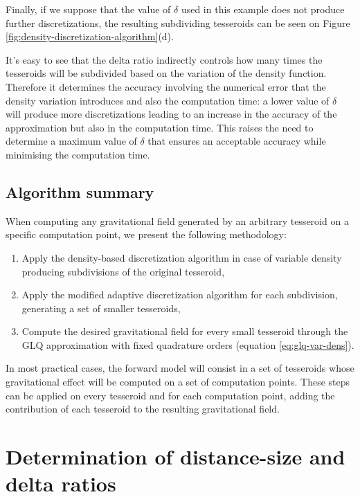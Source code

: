 \documentclass[extra]{gji}
\begin{document}
Finally, if we suppose that the value of $\delta$ used in this example
does not produce further discretizations, the resulting subdividing
tesseroids can be seen on Figure
\ref{fig:density-discretization-algorithm}(d).

It's easy to see that the delta ratio indirectly controls how many
times the tesseroids will be subdivided based on the variation of the
density function.
Therefore it determines the accuracy involving the numerical error that
the density variation introduces and also the computation time: a lower
value of $\delta$ will produce more discretizations leading to an
increase in the accuracy of the approximation but also in the
computation time.
This raises the need to determine a maximum value of $\delta$ that
ensures an acceptable accuracy while minimising the computation time.


\subsection{Algorithm summary}

When computing any gravitational field generated by an arbitrary tesseroid on
a specific computation point, we present the following methodology:

\begin{enumerate}
    \renewcommand{\theenumi}{(\arabic{enumi})}
    \item Apply the density-based discretization algorithm in case of
          variable density producing subdivisions of the original tesseroid,
    \item Apply the modified adaptive discretization algorithm for
          each subdivision, generating a set of smaller tesseroids,
    \item Compute the desired gravitational field for every small tesseroid
          through the GLQ approximation with fixed quadrature orders
          (equation \ref{eq:glq-var-dens}).
\end{enumerate}

In most practical cases, the forward model will consist in a set of
tesseroids whose gravitational effect will be computed on a set of
computation points.
These steps can be applied on every tesseroid and for each computation point,
adding the contribution of each tesseroid to the resulting
gravitational field.



\section{Determination of distance-size and delta ratios}
\end{document}
